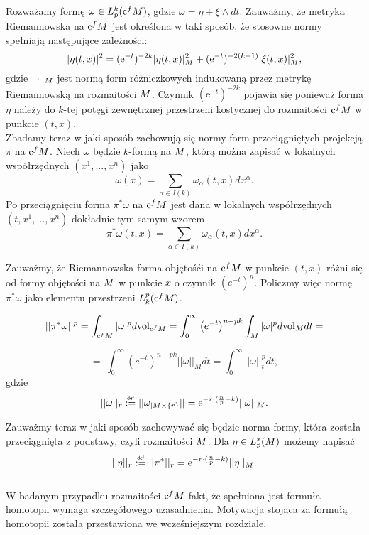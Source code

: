 \documentclass[licencjacka]{pracamgr}
\theoremstyle{definition}
\theoremstyle{definition}
\theoremstyle{plain}
\theoremstyle{plain}
\theoremstyle{plain}
\theoremstyle{plain}
\def\cfm{\ensuremath\mathrm{c}^fM}
\def\M{\ensuremath M}
\newcommand\deff{\mathrel{\overset{\makebox[0pt]{\mbox{\normalfont\tiny\sffamily def}}}{:=}}}
\begin{document}
Rozważamy formę $\omega \in L^k_p (\cfm)$, gdzie
$\omega = \eta + \xi \wedge dt$.
Zauważmy, że metryka Riemannowska na $\cfm$ jest określona w taki sposób, że
stosowne normy spełniają następujące zależności:
$$
| \eta(t,x) |^2 = (\mathrm{e}^{-t})^{-2k} | \eta(t,x) |^2_{\M} +
(\mathrm{e}^{-t})^{-2(k-1)} | \xi(t,x) |^2_{\M},
$$
gdzie $|\cdot |_{\M} $ jest normą form różniczkowych indukowaną przez
metrykę Riemannowską na rozmaitości $\M$.  Czynnik $(\mathrm{e}^{-t})^{-2k}$
pojawia się ponieważ forma $\eta$ należy do $k$-tej potęgi zewnętrznej
przestrzeni kostycznej do rozmaitości $\cfm$ w punkcie $(t,x)$.  \\


Zbadamy teraz w jaki sposób zachowują się normy form przeciągniętych 
projekcją $\pi$ na $\cfm$.
Niech $\omega$ będzie $k$-formą na $\M$, którą można zapisać w lokalnych
współrzędnych $(x^1, ..., x^n)$ jako
\[
\omega(x) = \sum_{\alpha \in I(k)} \omega_\alpha (t, x) dx^\alpha.
\]
Po przeciągnięciu forma $\pi^\ast \omega$ na $\cfm$ jest dana w lokalnych 
współrzędnych $(t, x^1, ..., x^n)$ dokładnie tym samym wzorem
\[
\pi^\ast \omega(t,x) = \sum_{\alpha \in I(k)} \omega_\alpha (t, x) dx^\alpha.
\]

Zauważmy, że Riemannowska forma objętośći na $\cfm$ w punkcie $(t,x)$ różni się
od formy objętości na $\M$ w punkcie $x$ o czynnik $(e^{-t})^n$.  Policzmy więc
normę $\pi^\ast \omega$ jako elementu przestrzeni $L_k^p (\cfm)$.

\[
    ||\pi^\ast \omega ||^p = \int_{\cfm} |\omega |^p d \mathrm{vol}_{\cfm} =
    \int_0^\infty \left( e^{-t} \right)^{n-pk} \int_M |\omega|^p d
    \mathrm{vol}_M dt = 
\]

\[
    = \
    \int_0^\infty \left( e^{-t} \right)^{n-pk} || \omega ||_{M} dt = 
    \int_0^\infty || \omega ||_t^p dt,
\] 
gdzie
\[
|| \omega ||_r \deff || \omega_{|M \times \{r\} } || =
\mathrm{e}^{-r \cdot (\frac{n}{p} - k) }  ||\omega ||_{\M}.
\]

Zauważmy teraz w jaki sposób zachowywać się będzie norma formy, która
została przeciągnięta z podstawy, czyli rozmaitości $\M$. Dla 
$\eta \in L_p^\ast (\M)$ możemy napisać
\[
    || \eta ||_r \deff || \pi^\ast ||_r = 
\mathrm{e}^{-r \cdot (\frac{n}{p} - k) }  ||\eta ||_{\M}.
\] \\

W badanym przypadku rozmaitości $\cfm$ fakt, że spełniona jest formuła homotopii
wymaga szczegółowego uzasadnienia. Motywacja stojaca za formułą homotopii
została przestawiona we wcześniejszym rozdziale.\\
\end{document}
